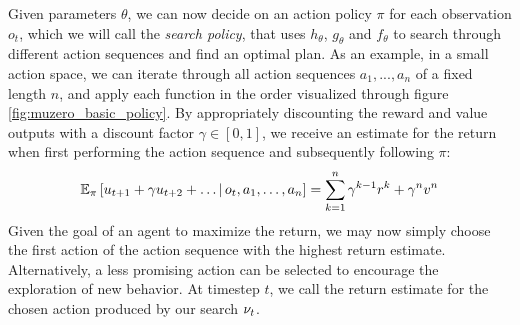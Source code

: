 Given parameters $\theta$, we can now decide on an action policy $\pi$ for each observation $o_t$, which we will call the \textit{search policy}, that uses $h_\theta$, $g_\theta$ and $f_\theta$ to search through different action sequences and find an optimal plan. As an example, in a small action space, we can iterate through all action sequences $a_1, ..., a_n$ of a fixed length $n$, and apply each function in the order visualized through figure \ref{fig:muzero_basic_policy}. By appropriately discounting the reward and value outputs with a discount factor $\gamma \in [0, 1]$, we receive an estimate for the return when first performing the action sequence and subsequently following $\pi$:
\begin{equation*}
    \mathbb{E}_\pi\left[
        u_{t+1} + \gamma u_{t+2} + \dots \,\middle|\, o_t, a_1, \dots, a_n
    \right] =
    \sum_{k=1}^n \gamma^{k-1} r^k + \gamma^n v^n
\end{equation*}
Given the goal of an agent to maximize the return, we may now simply choose the first action of the action sequence with the highest return estimate. Alternatively, a less promising action can be selected to encourage the exploration of new behavior. At timestep $t$, we call the return estimate for the chosen action produced by our search $\nu_t$.
